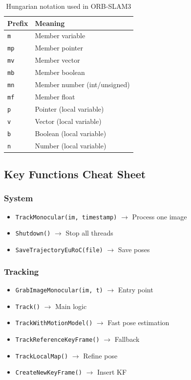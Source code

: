 \begin{table}[H]
\centering
\begin{tabular}{@{}ll@{}}
\toprule
\textbf{Prefix} & \textbf{Meaning} \\
\midrule
\texttt{m} & Member variable \\
\texttt{mp} & Member pointer \\
\texttt{mv} & Member vector \\
\texttt{mb} & Member boolean \\
\texttt{mn} & Member number (int/unsigned) \\
\texttt{mf} & Member float \\
\texttt{p} & Pointer (local variable) \\
\texttt{v} & Vector (local variable) \\
\texttt{b} & Boolean (local variable) \\
\texttt{n} & Number (local variable) \\
\bottomrule
\end{tabular}
\caption{Hungarian notation used in ORB-SLAM3}
\end{table}

\subsection{Key Functions Cheat Sheet}

\subsubsection{System}
\begin{itemize}
    \item \texttt{TrackMonocular(im, timestamp)} $\rightarrow$ Process one image
    \item \texttt{Shutdown()} $\rightarrow$ Stop all threads
    \item \texttt{SaveTrajectoryEuRoC(file)} $\rightarrow$ Save poses
\end{itemize}

\subsubsection{Tracking}
\begin{itemize}
    \item \texttt{GrabImageMonocular(im, t)} $\rightarrow$ Entry point
    \item \texttt{Track()} $\rightarrow$ Main logic
    \item \texttt{TrackWithMotionModel()} $\rightarrow$ Fast pose estimation
    \item \texttt{TrackReferenceKeyFrame()} $\rightarrow$ Fallback
    \item \texttt{TrackLocalMap()} $\rightarrow$ Refine pose
    \item \texttt{CreateNewKeyFrame()} $\rightarrow$ Insert KF
\end{itemize}


